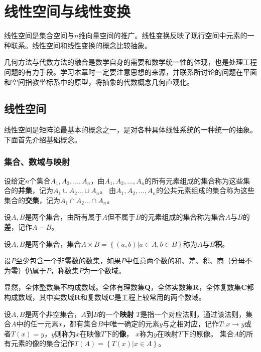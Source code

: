 \chapter{线性空间与线性变换}
线性空间是集合空间与$n$维向量空间的推广。线性变换反映了现行空间中元素的一种联系。线性空间和线性变换的概念比较抽象。

几何方法与代数方法的融合是数学自身的需要和数学统一性的体现，也是处理工程问题的有力手段。学习本章时一定要注意思想的来源，并联系所讨论的问题在平面和空间指教坐标系中的原型，将抽象的代数概念几何直观化。

\section{线性空间}
线性空间是矩阵论最基本的概念之一，是对各种具体线性系统的一种统一的抽象。下面首先介绍基础概念。
\subsection{集合、数域与映射}
设给定$n$个集合$A_{1},A_{2},\dots,A_{n}$，由$A_{1},A_{2},\dots,A_{n}$的所有元素组成的集合称为这些集合的\textbf{并集}，记为$A_{1}\cup{A_{2}}\dots\cup{A_{n}}$。
由$A_{1},A_{2},\dots,A_{n}$的公共元素组成的集合称为这些集合的\textbf{交集}，记为$A_{1}\cap{A_{2}}\dots\cap{A_{n}}$。

设$A,B$是两个集合，由所有属于$A$但不属于$B$的元素组成的集合称为集合$A$与$B$的\textbf{差}，记作$A-B$。

设$A,B$是两个集合，集合$A\times{B}=\left\{\left(a,b\right)\left|a\in{A},b\in{B}\right.\right\}$称为$A$与$B$\textbf{积}。

\begin{definition}
    设$P$至少包含一个非零数的数集，如果$P$中任意两个数的和、差、积、商（分母不为零）仍属于$P$，称数集$P$为一个数域。
\end{definition}

显然，全体整数集不构成数域。全体有理数集$\mathbf{Q}$，全体实数集$\mathbf{R}$，全体复数集$\mathbf{C}$都构成数域，其中实数域$\mathbf{R}$和复数域$\mathbf{C}$是工程上较常用的两个数域。

\begin{definition}
    设$A,B$是两个非空集合，$A$到$B$的一个\textbf{映射} $T$是指一个对应法则，通过该法则，集合$A$中的任一元素$x$，都有集合$B$中唯一确定的元素$y$与之相对应，记作$T:x\rightarrow{y}$或者$T(x)=y$，$y$则称为$x$在映像$T$下的\textbf{像}， $x$称为$y$在映射$T$下的原像。
    集合$A$的所有元素的像的集合记作$T(A)=\left\{T(x)\left|x\in{A}\right.\right\}$。
\end{definition}

